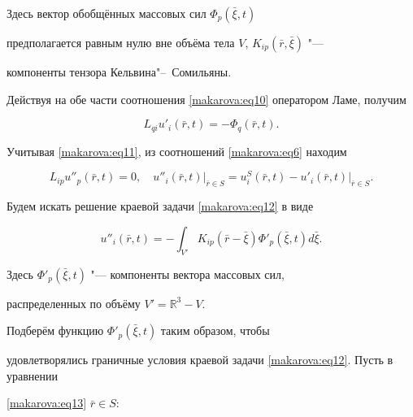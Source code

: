 Здесь вектор обобщённых массовых сил $\Phi_p (\bar {\xi } , t)$

предполагается равным нулю вне объёма тела $V$, $K_{ip} (\bar {r} , \bar {\xi })$ "---

компоненты тензора Кельвина"--~Сомильяны.



Действуя на обе части соотношения \eqref{makarova:eq10} оператором Ламе, получим

\begin{equation}

\label{makarova:eq11}

L_{qi} u'_i (\bar {r} , t)=-\Phi _q(\bar {r} , t).

\end{equation}

Учитывая \eqref{makarova:eq11}, из соотношений \eqref{makarova:eq6} находим

\begin{equation}

\label{makarova:eq12}

L_{ip} u''_p (\bar {r} , t)=0, \quad 

u''_i (\bar {r} , t)\big|_{\bar {r}\in S} = u_i^S (\bar {r} , t)- u'_i (\bar {r} , t)\big|

_{\bar {r}\in S}.

\end{equation}



Будем искать решение краевой задачи \eqref{makarova:eq12} в виде

\begin{equation}

\label{makarova:eq13}

u''_i (\bar {r} , t)=-\int_{V'}

K_{ip} (\bar {r}-\bar {\xi })\Phi'_p (\bar {\xi} , t)d\bar {\xi }.

\end{equation}

Здесь $\Phi'_p (\bar {\xi } , t)$ "--- компоненты вектора массовых сил,

распределенных по объёму $V'=\mathbb R^3-V$.



Подберём функцию $\Phi'_p (\bar {\xi} , t)$ таким образом, чтобы

удовлетворялись граничные условия краевой задачи \eqref{makarova:eq12}. Пусть в уравнении

\eqref{makarova:eq13} $\bar {r}\in S$:

